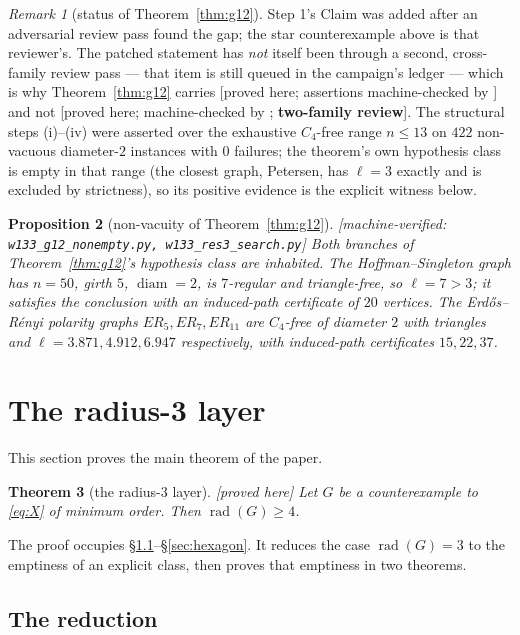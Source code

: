 \documentclass[11pt]{article}
\theoremstyle{plain}
\newtheorem{theorem}{Theorem}[section]
\newtheorem{proposition}[theorem]{Proposition}
\theoremstyle{definition}
\theoremstyle{remark}
\newtheorem{remark}[theorem]{Remark}
\numberwithin{equation}{section}
\newcommand{\rad}{\operatorname{rad}}
\newcommand{\diam}{\operatorname{diam}}
\newcommand{\statusbox}[1]{{\small\sloppy\textsf{[#1]}}}
\newcommand{\PRV}[1]{\statusbox{proved here; assertions machine-checked by \texttt{#1}}}
\newcommand{\PRVn}{\statusbox{proved here}}
\newcommand{\REV}[1]{\statusbox{proved here; machine-checked by \texttt{#1};
\textbf{two-family review}}}
\newcommand{\MV}[1]{\statusbox{machine-verified: \texttt{#1}}}
\begin{document}
\begin{remark}[status of Theorem~\ref{thm:g12}]
Step 1's Claim was added after an adversarial review pass found the gap; the star
counterexample above is that reviewer's. The patched statement has \emph{not} itself been
through a second, cross-family review pass --- that item is still queued in the campaign's
ledger --- which is why Theorem~\ref{thm:g12} carries \PRV{} and not \REV{}. The structural
steps (i)--(iv) were asserted over the exhaustive $C_4$-free range $n \le 13$ on $422$
non-vacuous diameter-$2$ instances with $0$ failures; the theorem's own hypothesis class is
empty in that range (the closest graph, Petersen, has $\ell = 3$ exactly and is excluded by
strictness), so its positive evidence is the explicit witness below.
\end{remark}

\begin{proposition}[non-vacuity of Theorem~\ref{thm:g12}]\label{prop:g12nonempty}
\MV{w133\_g12\_nonempty.py, w133\_res3\_search.py}
Both branches of Theorem~\ref{thm:g12}'s hypothesis class are inhabited. The
Hoffman--Singleton graph has $n = 50$, girth $5$, $\diam = 2$, is $7$-regular and
triangle-free, so $\ell = 7 > 3$; it satisfies the conclusion with an induced-path
certificate of $20$ vertices. The Erd\H{o}s--R\'enyi polarity graphs $ER_5, ER_7, ER_{11}$
are $C_4$-free of diameter $2$ \emph{with} triangles and $\ell = 3.871, 4.912, 6.947$
respectively, with induced-path certificates $15, 22, 37$.
\end{proposition}

\section{The radius-3 layer}\label{sec:r3}

This section proves the main theorem of the paper.

\begin{theorem}[the radius-$3$ layer]\label{thm:r3}
\PRVn
Let $G$ be a counterexample to \eqref{eq:X} of minimum order. Then $\rad(G) \ge 4$.
\end{theorem}

The proof occupies \S\ref{sec:reduction}--\S\ref{sec:hexagon}. It reduces the case
$\rad(G) = 3$ to the emptiness of an explicit class, then proves that emptiness in two
theorems.

\subsection{The reduction}\label{sec:reduction}
\end{document}
